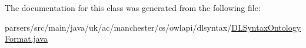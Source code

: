 The documentation for this class was generated from the following file\-:\begin{DoxyCompactItemize}
\item 
parsers/src/main/java/uk/ac/manchester/cs/owlapi/dlsyntax/\hyperlink{_d_l_syntax_ontology_format_8java}{D\-L\-Syntax\-Ontology\-Format.\-java}\end{DoxyCompactItemize}
